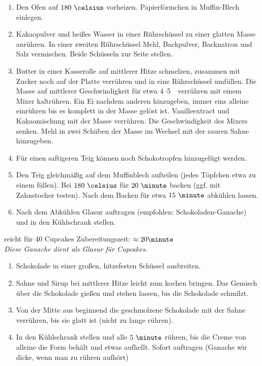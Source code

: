 \begin{enumerate}
 \item	Den Ofen auf $180~\celsius$ vorheizen. Papierförmchen in Muffin-Blech einlegen.
 \item	Kakaopulver und heißes Wasser in einer Rührschüssel zu einer glatten Masse anrühren.
	In einer zweiten Rührschüssel Mehl, Backpulver, Backnatron und Salz vermischen.
	Beide Schüsseln zur Seite stellen.
 \item	Butter in einer Kasserolle auf mittlerer Hitze schmelzen, zusammen mit Zucker noch auf der Platte verrühren und in eine
	Rührschüssel umfüllen.
	Die Masse auf mittlerer Geschwindigkeit für etwa 4--5~\minute\ verrühren mit einem Mixer kaltrühren.
	Ein Ei nachdem anderen hinzugeben, immer eins alleine einrühren bis es komplett in der Masse gelöst ist.
	Vanilleextract und Kakaomischung mit der Masse verrühren.
	Die Geschwindigkeit des Mixers senken.
	Mehl in zwei Schüben der Masse im Wechsel mit der sauren Sahne hinzugeben.
 \item  Für einen saftigeren Teig können noch Schokotropfen hinzugefügt werden.
 \item	Den Teig gleichmäßig auf dem Muffinblech aufteilen (jedes Töpfchen etwa zu einem  füllen).
	Bei $180~\celsius$ für $20~\minute$ backen (ggf. mit Zahnstocher testen).
	Nach dem Backen für etwa $15~\minute$ abkühlen lassen.
 \item Nach dem Abkühlen Glasur auftragen (empfohlen: Schokoladen-Ganache) und in den Kühlschrank stellen.
\end{enumerate}
reicht für 40 Cupcakes \hfill Zubereitungszeit: $\approx20 \minute$
\hspace{0em}\\
\textit{Diese Ganache dient als Glasur für Cupcakes.}
\begin{enumerate}
 \item	Schokolade in einer großen, hitzefesten Schüssel ausbreiten.
 \item	Sahne und Sirup bei mittlerer Hitze leicht zum kochen bringen.
	Das Gemisch über die Schokolade gießen und stehen lassen, bis die Schokolade schmilzt.
 \item	Von der Mitte aus beginnend die geschmolzene Schokolade mit der Sahne verrühren, bis sie glatt ist (nicht zu lange rühren).
 \item	In den Kühlschrank stellen und alle $5~\minute$ rühren, bis die Creme von alleine die Form behält und etwas aufhellt.
	Sofort auftragen (Ganache wir dicke, wenn man zu rühren aufhört)
\end{enumerate}


